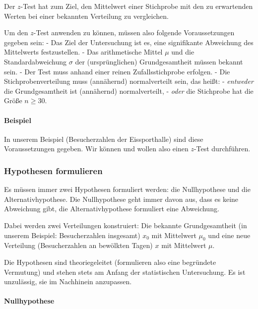 \documentclass[
  ngerman,
]{article}
\begin{document}
Der \(z\)-Test hat zum Ziel, den Mittelwert einer Stichprobe mit den zu erwartenden Werten bei einer bekannten Verteilung zu vergleichen.

Um den \(z\)-Test anwenden zu können, müssen also folgende Voraussetzungen gegeben sein:
- Das Ziel der Untersuchung ist es, eine signifikante Abweichung des Mittelwerts festzustellen.
- Das arithmetische Mittel \(\mu\) und die Standardabweichung \(\sigma\) der (ursprünglichen) Grundgesamtheit müssen bekannt sein.
- Der Test muss anhand einer reinen Zufallsstichprobe erfolgen.
- Die Stichprobenverteilung muss (annähernd) normalverteilt sein, das heißt:
- \emph{entweder} die Grundgesamtheit ist (annähernd) normalverteilt,
- \emph{oder} die Stichprobe hat die Größe \(n\geq30\).

\hypertarget{beispiel}{%
\paragraph{Beispiel}\label{beispiel}}

In unserem Beispiel (Besucherzahlen der Eissporthalle) sind diese Voraussetzungen gegeben. Wir können und wollen also einen \(z\)-Test durchführen.

\hypertarget{hypothesen-formulieren}{%
\subsubsection{Hypothesen formulieren}\label{hypothesen-formulieren}}

Es müssen immer zwei Hypothesen formuliert werden: die Nullhypothese und die Alternativhypothese. Die Nullhypothese geht immer davon aus, dass es keine Abweichung gibt, die Alternativhypothese formuliert eine Abweichung.

Dabei werden zwei Verteilungen konstruiert: Die bekannte Grundgesamtheit (in unserem Beispiel: Besucherzahlen insgesamt) \(x_0\) mit Mittelwert \(\mu_0\) und eine neue Verteilung (Besucherzahlen an bewölkten Tagen) \(x\) mit Mittelwert \(\mu\).

Die Hypothesen sind theoriegeleitet (formulieren also eine begründete Vermutung) und stehen stets am Anfang der statistischen Untersuchung. Es ist unzulässig, sie im Nachhinein anzupassen.

\hypertarget{nullhypothese}{%
\paragraph{Nullhypothese}\label{nullhypothese}}
\end{document}
